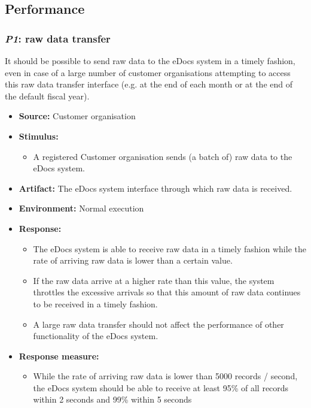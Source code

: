\documentclass[a4paper,10pt]{article}
\begin{document}
\subsection{Performance}
\subsubsection{\emph{P1}: raw data transfer }
It should  be possible to send raw data to the eDocs system in a timely fashion, even in case of a large number of customer organisations attempting to access this raw data transfer interface (e.g. at the end of each month or at the end of the default fiscal year).

\begin{itemize}
    \item \textbf{Source:} Customer organisation
    \item \textbf{Stimulus:}
        \begin{itemize}
            \item A registered Customer organisation sends (a batch of) raw data to the eDocs system.
        \end{itemize}

    \item \textbf{Artifact:} The eDocs system interface through which raw data is received.
    \item \textbf{Environment:} Normal execution
    \item \textbf{Response:}
        \begin{itemize}
		\item The eDocs system is able to receive raw data in a timely fashion while the rate of arriving raw data is lower than a certain value.
		\item If the raw data arrive at a higher rate than this value, the system throttles the excessive arrivals so that this amount of raw data continues to be received in a timely fashion.
		\item A large raw data transfer should not affect the performance of other functionality of the eDocs system.
        \end{itemize}

    \item \textbf{Response measure:}
        \begin{itemize}
		\item While the rate of arriving raw data is lower than 5000 records / second, the eDocs system should be able to receive at least 95\% of all records within 2 seconds and 99\% within 5 seconds
	\end{itemize}
\end{itemize}
\end{document}
